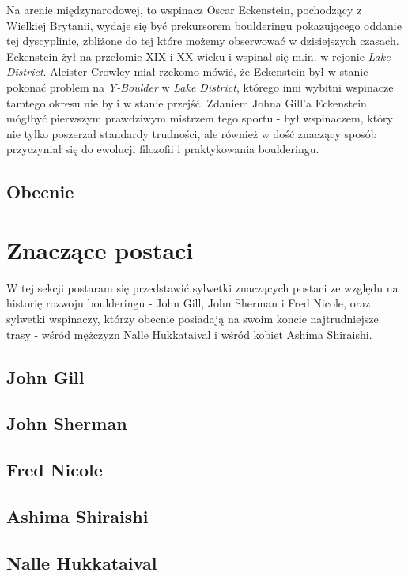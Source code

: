 \documentclass{article}
\begin{document}
Na arenie międzynarodowej, to wspinacz Oscar Eckenstein, pochodzący z Wielkiej Brytanii, wydaje się być prekursorem boulderingu pokazującego oddanie tej dyscyplinie, zbliżone do tej które możemy obserwować w dzisiejszych czasach. Eckenstein żył na przełomie XIX i XX wieku i wspinał się m.in. w rejonie \textit{Lake District}. Aleister Crowley miał rzekomo mówić, że Eckenstein był w stanie pokonać problem na \textit{Y-Boulder} w \textit{Lake District}, którego inni wybitni wspinacze tamtego okresu nie byli w stanie przejść. Zdaniem Johna Gill'a Eckenstein mógłbyć pierwszym prawdziwym mistrzem tego sportu - był wspinaczem, który nie tylko poszerzał standardy trudności, ale również w dość znaczący sposób przyczyniał się do ewolucji filozofii i praktykowania boulderingu.

\subsection{Obecnie}

\section{Znaczące postaci}
\lettrine[lines=2]{W}{} tej sekcji postaram się przedstawić sylwetki znaczących postaci ze względu na historię rozwoju boulderingu - John Gill, John Sherman i Fred Nicole, oraz sylwetki wspinaczy, którzy obecnie posiadają na swoim koncie najtrudniejsze trasy - wśród mężczyzn Nalle Hukkataival i wśród kobiet Ashima Shiraishi. 

\subsection{John Gill}
\label{jg}
\subsection{John Sherman}
\subsection{Fred Nicole}
\subsection{Ashima Shiraishi}
\subsection{Nalle Hukkataival}

\nocite{*}
\printbibliography
\end{document}
